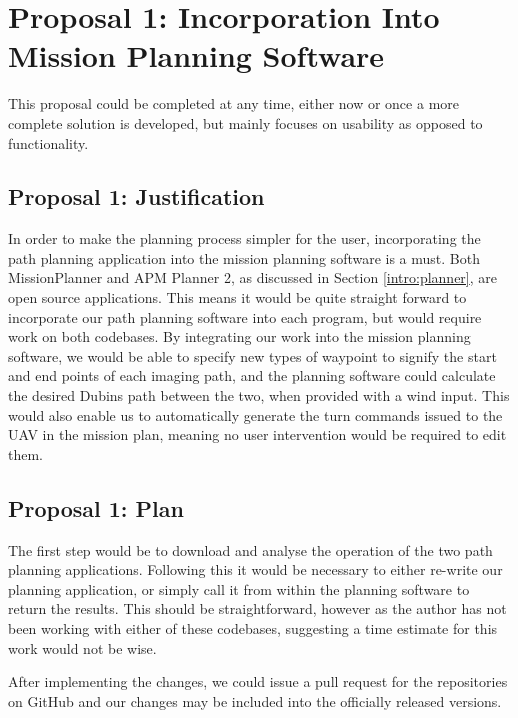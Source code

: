 \section{Proposal 1: Incorporation Into Mission Planning Software}
\label{future:missionplanner}
This proposal could be completed at any time, either now or once a more complete solution is developed, but mainly focuses on usability as opposed to functionality. 

\subsection{Proposal 1: Justification} 
\label{future:missionplannerreason}
In order to make the planning process simpler for the user, incorporating the path planning application into the mission planning software is a must. Both MissionPlanner and APM Planner 2, as discussed in Section \ref{intro:planner}, are open source applications. This means it would be quite straight forward to incorporate our path planning software into each program, but would require work on both codebases. By integrating our work into the mission planning software, we would be able to specify new types of waypoint to signify the start and end points of each imaging path, and the planning software could calculate the desired Dubins path between the two, when provided with a wind input. This would also enable us to automatically generate the turn commands issued to the UAV in the mission plan, meaning no user intervention would be required to edit them. 

\subsection{Proposal 1: Plan} 
\label{future:missionplannerplan}
The first step would be to download and analyse the operation of the two path planning applications. Following this it would be necessary to either re-write our planning application, or simply call it from within the planning software to return the results. This should be straightforward, however as the author has not been working with either of these codebases, suggesting a time estimate for this work would not be wise. 

After implementing the changes, we could issue a pull request for the repositories on GitHub and our changes may be included into the officially released versions.

